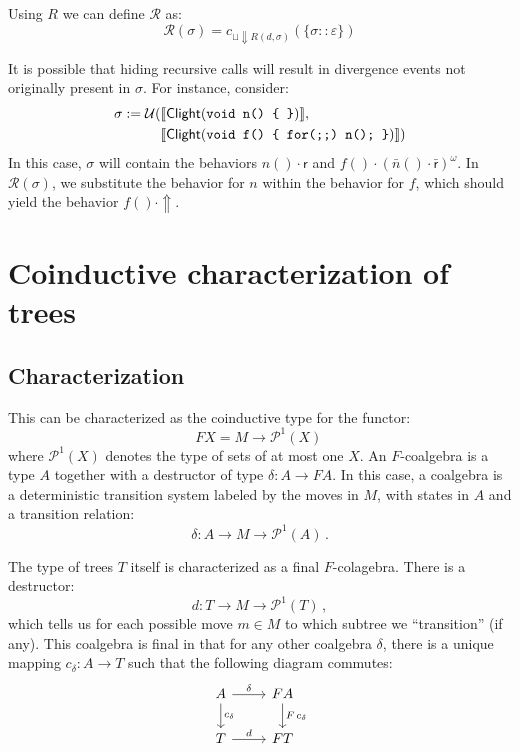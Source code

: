 \documentclass[11pt]{article}
\newcommand{\kw}[1]{{\mathsf{#1}}}
\begin{document}
Using $R$ we can define $\mathcal{R}$ as:
\[ \mathcal{R}(\sigma) = c_{\sqcup \Downarrow R(d, \sigma)}(\{ \sigma :: \varepsilon \}) \]

It is possible that hiding recursive calls
will result in divergence events not originally present in $\sigma$.
For instance, consider:
\begin{align*}
  \sigma := \mathcal{U}(&\llbracket \kw{Clight}(\mbox{\tt void n() \{ \}}) \rrbracket, \\
 &\llbracket \kw{Clight}(\mbox{\tt void f() \{ for(;;) n(); \}}) \rrbracket)
\end{align*}
In this case, $\sigma$ will contain the behaviors
$n() \cdot \kw{r}$ and $f() \cdot (\bar{n}() \cdot \bar{\kw{r}})^\omega$.
In $\mathcal{R}(\sigma)$,
we substitute the behavior for $n$ within the behavior for $f$,
which should yield the behavior $f() \cdot \Uparrow$.




\appendix

\section{Coinductive characterization of trees}
\label{sec:treecoind}

\subsection{Characterization}

This can be characterized as the coinductive type for the functor:
\[ F X = M \rightarrow \mathcal{P}^1(X)\, \]
where $\mathcal{P}^1(X)$ denotes the type of sets of at most one $X$.
An $F$-coalgebra is a type $A$
together with a destructor of type $\delta : A \rightarrow F A$.
In this case, a coalgebra is a deterministic transition system
labeled by the moves in $M$,
with states in $A$ and a transition relation:
\[ \delta : A \rightarrow M \rightarrow \mathcal{P}^1(A) \, . \]

The type of trees $T$ itself is characterized as a final $F$-colagebra.
There is a destructor:
\[ d : T \rightarrow M \rightarrow \mathcal{P}^1(T) \, , \]
which tells us for each possible move $m \in M$
to which subtree we ``transition'' (if any).
This coalgebra is final in that for any other coalgebra $\delta$,
there is a unique mapping $c_{\delta} : A \rightarrow T$
such that the following diagram commutes:
\[
  \begin{tikzcd}
    A \arrow[r, "\delta"]
      \arrow[d, "c_{\delta}"] &
    F A \arrow[d, "F \, c_\delta"] \\
    T \arrow[r, "d"] &
    F T
  \end{tikzcd}
\]
\end{document}
